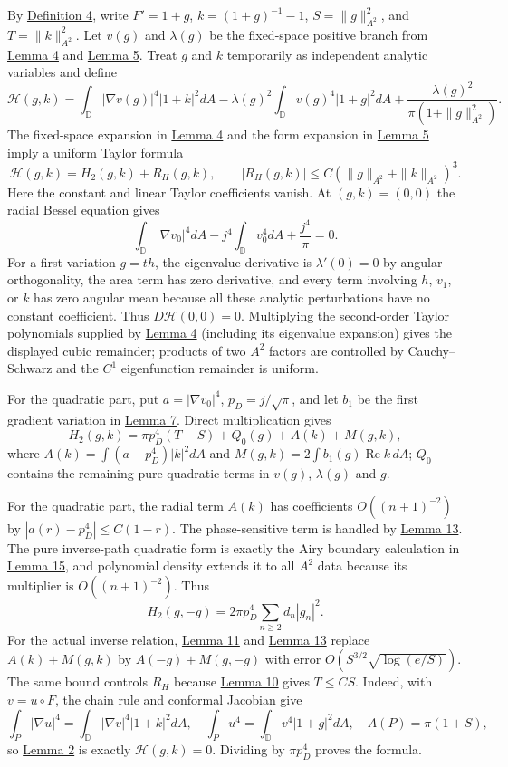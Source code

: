 \documentclass[11pt]{article}
\begin{document}
By \hyperref[def-conformal-data]{Definition 4}, write \(F'=1+g\),
\(k=(1+g)^{-1}-1\), \(S=\|g\|_{A^2}^2\), and \(T=\|k\|_{A^2}^2\). Let
\(v(g)\) and \(\lambda(g)\) be the fixed-space positive branch from
\hyperref[lem-c1-perturbation]{Lemma 4} and
\hyperref[lem-disk-perturbation]{Lemma 5}. Treat \(g\) and \(k\)
temporarily as independent analytic variables and define \[
\mathscr H(g,k)=\int_{\mathbb D}|\nabla v(g)|^4|1+k|^2dA
-\lambda(g)^2\int_{\mathbb D}v(g)^4|1+g|^2dA
 +\frac{\lambda(g)^2}{\pi(1+\|g\|_{A^2}^2)}.
\] The fixed-space expansion in \hyperref[lem-c1-perturbation]{Lemma 4}
and the form expansion in \hyperref[lem-disk-perturbation]{Lemma 5}
imply a uniform Taylor formula \[
\mathscr H(g,k)=H_2(g,k)+R_H(g,k),
\qquad |R_H(g,k)|\le C(\|g\|_{A^2}+\|k\|_{A^2})^3.
\] Here the constant and linear Taylor coefficients vanish. At
\((g,k)=(0,0)\) the radial Bessel equation gives \[
\int_{\mathbb D}|\nabla v_0|^4dA-j^4\int_{\mathbb D}v_0^4dA+\frac{j^4}{\pi}=0.
\] For a first variation \(g=th\), the eigenvalue derivative is
\(\lambda'(0)=0\) by angular orthogonality, the area term has zero
derivative, and every term involving \(h\), \(v_1\), or \(k\) has zero
angular mean because all these analytic perturbations have no constant
coefficient. Thus \(D\mathscr H(0,0)=0\). Multiplying the second-order
Taylor polynomials supplied by \hyperref[lem-c1-perturbation]{Lemma 4}
(including its eigenvalue expansion) gives the displayed cubic
remainder; products of two \(A^2\) factors are controlled by
Cauchy--Schwarz and the \(C^1\) eigenfunction remainder is uniform.

For the quadratic part, put \(a=|\nabla v_0|^4\), \(p_D=j/\sqrt\pi\),
and let \(b_1\) be the first gradient variation in
\hyperref[lem-gradient-perturbation]{Lemma 7}. Direct multiplication
gives \[
H_2(g,k)=\pi p_D^4(T-S)+Q_0(g)+A(k)+M(g,k),
\] where \(A(k)=\int(a-p_D^4)|k|^2dA\) and
\(M(g,k)=2\int b_1(g)\operatorname{Re}k\,dA\); \(Q_0\) contains the
remaining pure quadratic terms in \(v(g)\), \(\lambda(g)\) and \(g\).

For the quadratic part, the radial term \(A(k)\) has coefficients
\(O((n+1)^{-2})\) by \(|a(r)-p_D^4|\le C(1-r)\). The phase-sensitive
term is handled by \hyperref[lem-bilinear-mode-replacement]{Lemma 13}.
The pure inverse-path quadratic form is exactly the Airy boundary
calculation in \hyperref[lem-airy-boundary-quadratic]{Lemma 15}, and
polynomial density extends it to all \(A^2\) data because its multiplier
is \(O((n+1)^{-2})\). Thus \[
H_2(g,-g)=2\pi p_D^4\sum_{n\ge2}d_n|g_n|^2.
\] For the actual inverse relation,
\hyperref[lem-frequency-replacement]{Lemma 11} and
\hyperref[lem-bilinear-mode-replacement]{Lemma 13} replace
\(A(k)+M(g,k)\) by \(A(-g)+M(g,-g)\) with error
\(O(S^{3/2}\sqrt{\log(e/S)})\). The same bound controls \(R_H\) because
\hyperref[lem-inverse-energy]{Lemma 10} gives \(T\le CS\). Indeed, with
\(v=u\circ F\), the chain rule and conformal Jacobian give \[
\int_P|\nabla u|^4=\int_{\mathbb D}|\nabla v|^4|1+k|^2dA,
\quad
\int_Pu^4=\int_{\mathbb D}v^4|1+g|^2dA,
\quad
A(P)=\pi(1+S),
\] so \hyperref[lem-airy-identity]{Lemma 2} is exactly
\(\mathscr H(g,k)=0\). Dividing by \(\pi p_D^4\) proves the formula.
\end{document}
